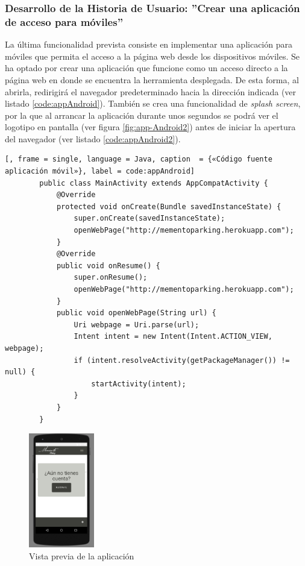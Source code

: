 	\subsubsection{Desarrollo de la Historia de Usuario: ''Crear una aplicación de acceso para móviles''}
La última funcionalidad prevista consiste en implementar una aplicación para móviles que permita el acceso a la página web desde los dispositivos móviles. Se ha optado por crear una aplicación que funcione como un acceso directo a la página web en donde se encuentra la herramienta desplegada. De esta forma, al abrirla, redirigirá el navegador predeterminado hacia la dirección indicada (ver listado \ref{code:appAndroid}). También se crea una funcionalidad de \textit{splash screen}, por la que al arrancar la aplicación durante unos segundos se podrá ver el logotipo en pantalla (ver figura \ref{fig:app-Android2}) antes de iniciar la apertura del navegador (ver listado \ref{code:appAndroid2}).


	
	\begin{lstlisting}[, frame = single, language = Java, caption  = {«Código fuente aplicación móvil»}, label = code:appAndroid]
		public class MainActivity extends AppCompatActivity {
		    @Override
		    protected void onCreate(Bundle savedInstanceState) {
		        super.onCreate(savedInstanceState);
		        openWebPage("http://mementoparking.herokuapp.com");
		    }
		    @Override
		    public void onResume() {
		        super.onResume();
		        openWebPage("http://mementoparking.herokuapp.com");
		    }
		    public void openWebPage(String url) {
		        Uri webpage = Uri.parse(url);
		        Intent intent = new Intent(Intent.ACTION_VIEW, webpage);
		        if (intent.resolveActivity(getPackageManager()) != null) {
		            startActivity(intent);
		        }
		    }
		}
	\end{lstlisting}
	
	\begin{figure}[H]
		\centering
		\includegraphics[height=5cm, fbox={\fboxrule} 4mm]{images/05-resultados/25-app_Android.png}
		\caption{Vista previa de la aplicación}
		\label{fig:app-Android}
	\end{figure}
	
